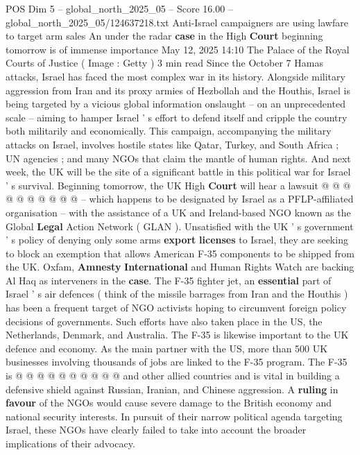 \begin{textsample}{POS Dim 5 – global\_north\_2025\_05 – Score 16.00 – global\_north\_2025\_05/124637218.txt}  \label{ex:f5_pos_080}
Anti-Israel campaigners are using lawfare to target arm sales An under the radar \textbf{case} in the High \textbf{Court} beginning tomorrow is of immense importance May 12, 2025 14:10 The Palace of the Royal Courts of Justice ( Image : Getty ) 3 min read Since the October 7 Hamas attacks, Israel has faced the most complex war in its history.
Alongside military aggression from Iran and its proxy armies of Hezbollah and the Houthis, Israel is being targeted by a vicious global information onslaught -- on an unprecedented scale -- aiming to hamper Israel ' s effort to defend itself and cripple the country both militarily and economically.
This campaign, accompanying the military attacks on Israel, involves hostile states like Qatar, Turkey, and South Africa ; UN agencies ; and many NGOs that claim the mantle of human rights.
And next week, the UK will be the site of a significant battle in this political war for Israel ' s survival.
Beginning tomorrow, the UK High \textbf{Court} will hear a lawsuit @ @ @ @ @ @ @ @ @ @ -- which happens to be designated by Israel as a PFLP-affiliated organisation -- with the assistance of a UK and Ireland-based NGO known as the Global \textbf{Legal} Action Network ( GLAN ).
Unsatisfied with the UK ' s government ' s policy of denying only some arms \textbf{export} \textbf{licenses} to Israel, they are seeking to block an exemption that allows American F-35 components to be shipped from the UK.
Oxfam, \textbf{Amnesty} \textbf{International} and Human Rights Watch are backing Al Haq as interveners in the \textbf{case}.
The F-35 fighter jet, an \textbf{essential} part of Israel ' s air defences ( think of the missile barrages from Iran and the Houthis ) has been a frequent target of NGO activists hoping to circumvent foreign policy decisions of governments.
Such efforts have also taken place in the US, the Netherlands, Denmark, and Australia.
The F-35 is likewise important to the UK defence and economy.
As the main partner with the US, more than 500 UK businesses involving thousands of jobs are linked to the F-35 program.
The F-35 is @ @ @ @ @ @ @ @ @ @ and other allied countries and is vital in building a defensive shield against Russian, Iranian, and Chinese aggression.
A \textbf{ruling} in \textbf{favour} of the NGOs would cause severe damage to the British economy and national security interests.
In pursuit of their narrow political agenda targeting Israel, these NGOs have clearly failed to take into account the broader implications of their advocacy.

\end{textsample}
